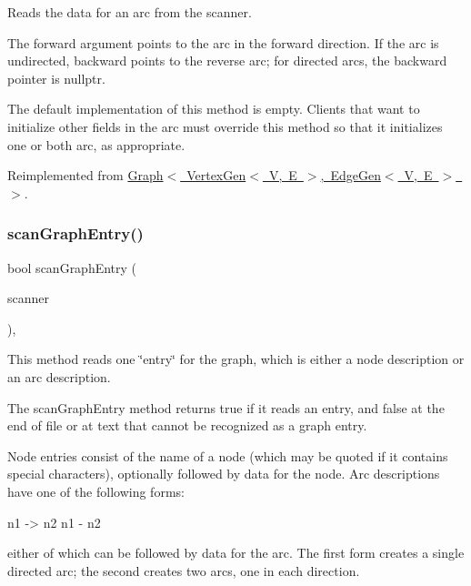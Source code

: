 Reads the data for an arc from the scanner. 

The {\ttfamily forward} argument points to the arc in the forward direction. If the arc is undirected, {\ttfamily backward} points to the reverse arc; for directed arcs, the {\ttfamily backward} pointer is {\ttfamily nullptr}.

The default implementation of this method is empty. Clients that want to initialize other fields in the arc must override this method so that it initializes one or both arc, as appropriate. 

Reimplemented from \mbox{\hyperlink{classGraph_ac73c985ef66569e5f6df9c315cab466b}{Graph$<$ Vertex\+Gen$<$ V, E $>$, Edge\+Gen$<$ V, E $>$ $>$}}.

\mbox{\label{classGraph_a1c4e1a05a40013ce4e4bb539d05b9937}} 
\subsubsection{\texorpdfstring{scan\+Graph\+Entry()}{scanGraphEntry()}}
{\footnotesize\ttfamily bool scan\+Graph\+Entry (\begin{DoxyParamCaption}\item[{\mbox{\hyperlink{classTokenScanner}{Token\+Scanner}} \&}]{scanner }\end{DoxyParamCaption})\hspace{0.3cm}{\ttfamily [virtual]}, {\ttfamily [inherited]}}



This method reads one \char`\"{}entry\char`\"{} for the graph, which is either a node description or an arc description. 

The {\ttfamily scan\+Graph\+Entry} method returns {\ttfamily true} if it reads an entry, and {\ttfamily false} at the end of file or at text that cannot be recognized as a graph entry.

Node entries consist of the name of a node (which may be quoted if it contains special characters), optionally followed by data for the node. Arc descriptions have one of the following forms\+:


\begin{DoxyPre}
n1 -> n2
n1 - n2
\end{DoxyPre}


either of which can be followed by data for the arc. The first form creates a single directed arc; the second creates two arcs, one in each direction.

